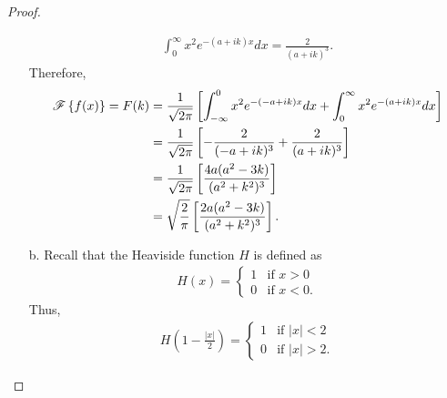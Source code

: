 \begin{proof}
\begin{enumerate}
\begin{align*}
        \int_{0}^\infty x^2 e^{-(a+ik)x} dx = \frac{2}{(a+ik)^3}.
      \end{align*}
      Therefore,
      \begin{align*}
        \mathscr{F}\left\{ {f(x)} \right\} = F(k)
        &= \frac{1}{\sqrt{2\pi}}\left[\int_{-\infty}^0 x^2 e^{-(-a+ik)x} dx + \int_{0}^\infty x^2 e^{-(a+ik)x} dx\right]\\
        &= \frac{1}{\sqrt{2\pi}}\left[-\frac{2}{(-a+ik)^3} + \frac{2}{(a+ik)^3}\right] \\
        &= \frac{1}{\sqrt{2\pi}}\left[\frac{4a(a^2-3k)}{(a^2+k^2)^3}\right] \\
        &= \sqrt{\frac{2}{\pi}}\left[\frac{2a(a^2-3k)}{(a^2+k^2)^3}\right].
      \end{align*}
    \item[b.] Recall that the Heaviside function $H$ is defined as
      \begin{align*}
        H(x) = \begin{cases}
          1 & \text{if $x > 0$}\\
          0 & \text{if $x < 0$}.
        \end{cases}
      \end{align*}
      Thus,
      \begin{align*}
        H\left(1-\frac{|x|}{2}\right) = \begin{cases}
          1 & \text{if $|x| < 2$}\\
          0 & \text{if $|x| > 2$}.
        \end{cases}
      \end{align*}


\end{enumerate}
\end{proof}
